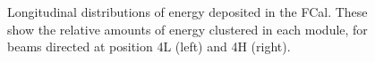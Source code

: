 %
%
%


%
%
\begin{figure}[!htb]
\begin{center}
\caption{Longitudinal distributions of energy deposited in the FCal. These show the relative amounts of energy clustered in each module, for beams directed at position 4L (left) and 4H (right).}
\label{TBplot_long_profiles}
\end{center}
\end{figure}


%
%
%

